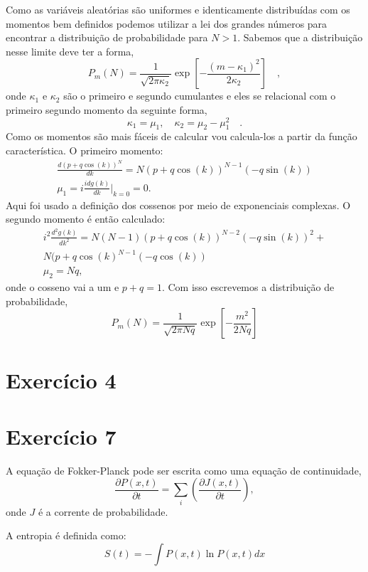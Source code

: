 \documentclass[12pt]{article}
\begin{document}
Como as variáveis aleatórias são uniformes e identicamente distribuídas com os momentos bem definidos podemos utilizar a lei dos grandes números para encontrar a distribuição de probabilidade para $N > 1$. Sabemos que a distribuição nesse limite deve ter a forma,
\begin{equation}
P_m(N) = \frac{1}{\sqrt{2\pi \kappa_2}}\exp{\left[-\frac{(m-\kappa_1)^2}{2\kappa_2}\right]} \quad ,
\end{equation}
onde $\kappa_1$ e $\kappa_2$ são o primeiro e segundo cumulantes e eles se relacional com o primeiro segundo momento da seguinte forma,
\begin{equation}
\kappa_1 = \mu_1, \quad \kappa_2 = \mu_2 - \mu_1^2\quad. 
\end{equation}
Como os momentos são mais fáceis de calcular vou calcula-los a partir da função característica. O primeiro momento:
\begin{equation}
\begin{split}
\frac{d(p + q\cos(k))^N}{dk} = N(p + q\cos(k))^{N-1}(-q\sin(k))\\
\mu_1 = i\frac{idg(k)}{dk}\Big\rvert_{k=0} = 0. 
\end{split}
\end{equation}
Aqui foi usado a definição dos cossenos por meio de exponenciais complexas. O segundo momento é então calculado:
\begin{equation}
\begin{split}
i^2\frac{d^2g(k)}{dk^2} =  N(N-1)(p + q\cos(k))^{N-2}(-q\sin(k))^2 +\\
N(p + q\cos(k)^{N-1}(-q\cos(k))\\
\mu_2 = Nq,
\end{split}
\end{equation}
onde o cosseno vai a um e $p+q=1$. 
Com isso escrevemos a distribuição de probabilidade,
\begin{equation}
P_m(N) = \frac{1}{\sqrt{2\pi Nq}}\exp{\left[-\frac{m^2}{2Nq}\right]}
\end{equation}

\section*{Exercício 4}

\section*{Exercício 7}
A equação de Fokker-Planck pode ser escrita como uma equação de continuidade,
\begin{equation}
\frac{\partial P(x,t)}{\partial t} = \sum_i\left( \frac{\partial J(x, t)}{\partial t}\right),
\end{equation}
onde $J$ é a corrente de probabilidade. 

A entropia é definida como:
\begin{equation}
S(t) = -\int P(x,t) \ln P(x,t) dx
\end{equation}
\end{document}
